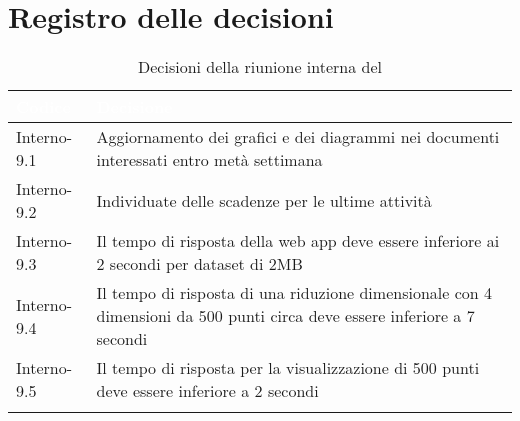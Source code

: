 \section{Registro delle decisioni}
{
\renewcommand{\arraystretch}{1.5}
\centering
\begin{longtable}{C{3cm} C{9cm}}
\textcolor{white}{\textbf{Codice}}&
\textcolor{white}{\textbf{Decisione}}\\	

\endhead
		
Interno-9.1 & Aggiornamento dei grafici e dei diagrammi nei documenti interessati entro metà settimana\\
Interno-9.2 & Individuate delle scadenze per le ultime attività\\
Interno-9.3 & Il tempo di risposta della web app deve essere inferiore ai 2 secondi per dataset di 2MB\\
Interno-9.4 & Il tempo di risposta di una riduzione dimensionale con 4 dimensioni da 500 punti circa deve essere inferiore a 7 secondi\\
Interno-9.5 & Il tempo di risposta per la visualizzazione di 500 punti deve essere inferiore a 2 secondi\\

\caption{Decisioni della riunione interna del \Data{}}
\end{longtable}
}

